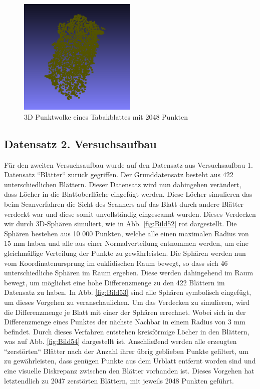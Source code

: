 \documentclass{llncs}
\begin{document}
\begin{figure}[htbp] 
	\centering
	\includegraphics[width=0.5\textwidth]{leaf1.png}
	\caption{3D Punktwolke eines Tabakblattes mit 2048 Punkten}
	\label{fig:Bild51}
\end{figure}
\newpage
\subsection{Datensatz 2. Versuchsaufbau}\label{sec:versuch2_daten}

Für den zweiten Versuchsaufbau wurde auf den Datensatz aus Versuchsaufbau 1. Datensatz ``Blätter`` zurück gegriffen. Der Grunddatensatz besteht aus 422 unterschiedlichen Blättern. Dieser Datensatz wird nun dahingehen verändert, dass Löcher in die Blattoberfläche eingefügt werden. Diese Löcher simulieren das beim Scanverfahren die Sicht des Scanners auf das Blatt durch andere Blätter verdeckt war und diese somit unvollständig eingescannt wurden. Dieses Verdecken wir durch 3D-Sphären simuliert, wie in Abb. \ref{fig:Bild52}  rot dargestellt. Die Sphären bestehen aus 10 000 Punkten, welche alle einen maximalen Radius von 15 mm haben und alle aus einer Normalverteilung entnommen werden, um  eine gleichmäßige Verteilung der Punkte zu gewährleisten. Die Sphären werden nun vom Koordinatenursprung im euklidischen Raum bewegt, so dass sich 46 unterschiedliche Sphären im Raum ergeben. Diese werden dahingehend im Raum bewegt, um möglichst eine hohe Differenzmenge zu den 422 Blättern im Datensatz zu haben. In Abb. \ref{fig:Bild53} sind alle Sphären symbolisch eingefügt, um dieses Vorgehen zu veranschaulichen. Um das Verdecken zu simulieren, wird die Differenzmenge je Blatt mit einer der Sphären errechnet. Wobei sich in der Differenzmenge eines Punktes der nächste Nachbar in einem Radius von 3 mm befindet. Durch dieses Verfahren entstehen kreisförmige Löcher in den Blättern, was auf Abb. \ref{fig:Bild54} dargestellt ist. Anschließend werden alle erzeugten ``zerstörten`` Blätter nach der Anzahl ihrer übrig geblieben Punkte gefiltert, um zu gewährleisten, dass genügen Punkte aus dem Urblatt entfernt worden sind und eine visuelle Diskrepanz zwischen den Blätter vorhanden ist. Dieses Vorgehen hat letztendlich zu 2047 zerstörten Blättern, mit jeweils 2048 Punkten geführt.
\end{document}
